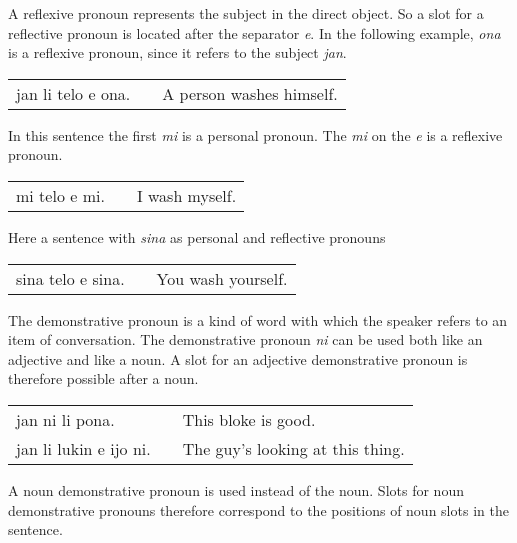 A reflexive pronoun represents the subject in the direct object. 
So a slot for a reflective pronoun is located after the separator \textit{e}. 
In the following example, \textit{ona} is a reflexive pronoun, since it refers to the subject \textit{jan}. 

\begin{supertabular}{p{5,5cm}|ll}
jan li telo e ona. && A person washes himself. \\
\end{supertabular}

In this sentence the first \textit{mi} is a personal pronoun.
The \textit{mi} on the \textit{e} is a reflexive pronoun. 

\begin{supertabular}{p{5,5cm}|ll}
mi telo e mi. && I wash myself. \\
\end{supertabular}

Here a sentence with \textit{sina} as personal and reflective pronouns

\begin{supertabular}{p{5,5cm}|ll}
sina telo e sina. && You wash yourself. \\
\end{supertabular}

%
%

The demonstrative pronoun is a kind of word with which the speaker refers to an  item of conversation. 
The demonstrative pronoun \textit{ni} can be used both like an adjective and like a noun.  
A slot for an adjective demonstrative pronoun is therefore possible after a noun. 

\begin{supertabular}{p{5,5cm}|ll}
jan ni li pona. && This bloke is good. \\
jan li lukin e ijo ni. && The guy's looking at this thing. \\
\end{supertabular}

A noun demonstrative pronoun is used instead of the noun. 
Slots for noun demonstrative pronouns therefore correspond to the positions of noun slots in the sentence. 

